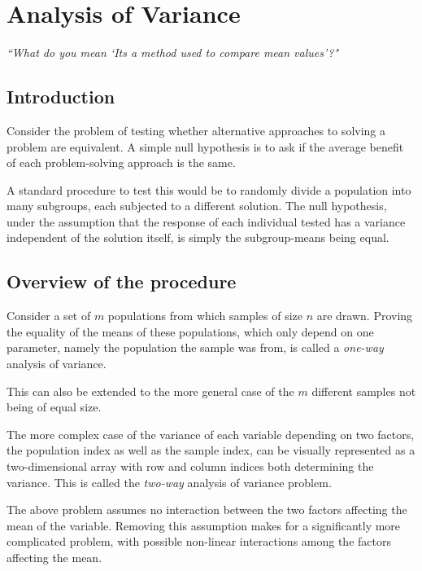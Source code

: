 \chapter{Analysis of Variance}


\begin{flushright}
	\textit{``What do you mean `Its a method used to compare mean values'?"} 
\end{flushright}

\section{Introduction}

Consider the problem of testing whether alternative approaches to solving a problem are equivalent. A simple null hypothesis is to ask if the average benefit of each problem-solving approach is the same.
	
A standard procedure to test this would be to randomly divide a population into many subgroups, each subjected to a different solution. The null hypothesis, under the assumption that the response of each individual tested has a variance independent of the solution itself, is simply the subgroup-means being equal.

\section{Overview of the procedure}

Consider a set of $ m $ populations from which samples of size $ n $ are drawn. Proving the equality of the means of these populations, which only depend on one parameter, namely the population the sample was from, is called a \textit{one-way} analysis of variance.

This can also be extended to the more general case of the $ m $ different samples not being of equal size.

The more complex case of the variance of each variable depending on two factors, the population index as well as the sample index, can be visually represented as a two-dimensional array with row and column indices both determining the variance. This is called the \textit{two-way} analysis of variance problem.

The above problem assumes no interaction between the two factors affecting the mean of the variable. Removing this assumption makes for a significantly more complicated problem, with possible non-linear interactions among the factors affecting the mean.

